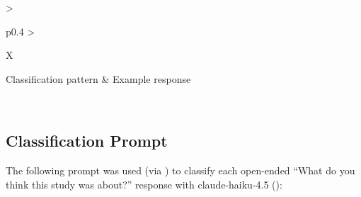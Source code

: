 \begin{table}[htbp]
\centering
\caption{Example Responses by Classification Pattern}
\label{tab:debrief_examples}
{\setlength{\extrarowheight}{3pt}
\begin{tabularx}{\textwidth}{>{\raggedright\arraybackslash}p{0.4\textwidth} >{\raggedright\arraybackslash}X}
\toprule
Classification pattern & Example response \\
\midrule

\\
\bottomrule
\end{tabularx}}
\end{table}

\clearpage

\subsection*{Classification Prompt}
\label{sec:classification_prompt}

\begin{sloppypar}
\noindent The following prompt was used (via
) to classify each open-ended
``What do you think this study was about?'' response with claude-haiku-4.5
():
\end{sloppypar}

\vspace{0.5em}

